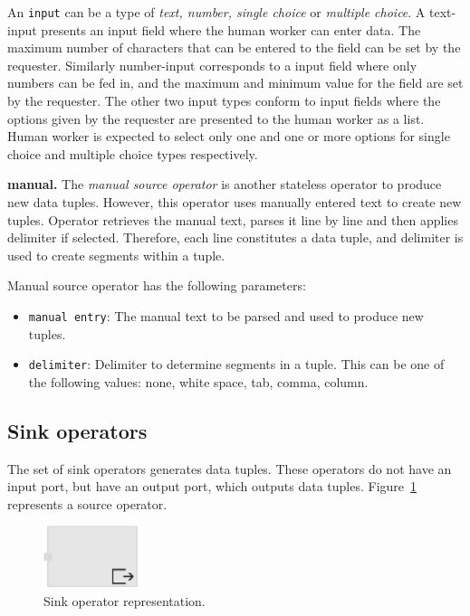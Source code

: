 An \texttt{input} can be a type of \textit{text, number, single choice} or 
\textit{multiple choice}. A text-input presents an input field where the human worker can 
enter data. The maximum number of characters that can be entered to the field can be 
set by the requester. Similarly number-input corresponds to a input field where only 
numbers can be fed in, and the maximum and minimum value for the field are set by 
the requester. The other two input types conform to input fields where the options given 
by the requester are presented to the human worker as a list. Human worker is expected 
to select only one and one or more options for single choice and multiple choice types 
respectively.


\textbf{manual.}
The \textit{manual source operator} is another stateless operator to produce new data 
tuples. However, this operator uses manually entered text to create new tuples. Operator 
retrieves the manual text, parses it line by line and then applies delimiter if selected. 
Therefore, each line constitutes a data tuple, and delimiter is used to create segments 
within a tuple.

Manual source operator has the following parameters:
\begin{itemize}
	\item \texttt{manual entry}: The manual text to be parsed and used to produce 
	new tuples.
	\item \texttt{delimiter}: Delimiter to determine segments in a tuple. This can be one 
	of the following values: none, white space, tab, comma, column.
\end{itemize}

\subsection{Sink operators}
The set of sink operators generates data tuples. These operators do not have 
an input port, but have an output port, which outputs data tuples. Figure~\ref{fig:sinkoperator} 
represents a source operator.

\begin{figure}[ht]
	\centering
	\includegraphics[width=0.25\textwidth]{figures/SinkOperator.pdf}
	\caption{Sink operator representation.}
	\label{fig:sinkoperator}
\end{figure}

